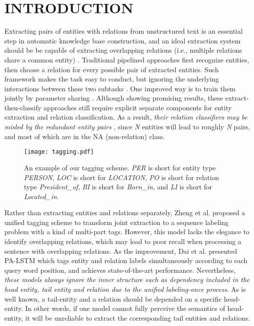 \documentclass{ecai}
\begin{document}
\section{INTRODUCTION}
Extracting pairs of entities with relations from unstructured text is an essential step in automatic knowledge base construction, and an ideal extraction system should be be capable of extracting overlapping relations (i.e., multiple relations share a common entity) \cite{zeng2018extracting}.
Traditional pipelined approaches first recognize entities, then choose a relation for every possible pair of extracted entities.
Such framework makes the task easy to conduct, but ignoring the underlying interactions between these two subtasks \cite{li2014incremental}.
One improved way is to train them jointly by parameter sharing \cite{fu-etal-2019-graphrel,miwa2016end,sun2019joint}.
Although showing promising results, these extract-then-classify approaches still require explicit separate components for entity extraction and relation classification.
As a result, \emph{their relation classifiers may be misled by the redundant entity pairs} \cite{dai2019joint,tan2019jointly}, since \emph{N} entities will lead to roughly \emph{N} pairs, and most of which are in the NA (non-relation) class.

\begin{figure*}
\centerline{\texttt{[image: tagging.pdf]}}
    \caption{An example of our tagging scheme. \emph{PER} is short for entity type \emph{PERSON}, \emph{LOC} is short for \emph{LOCATION}, \emph{PO} is short for relation type \emph{President\_of}, \emph{BI} is short for \emph{Born\_in}, and \emph{LI} is short for \emph{Located\_in}.}\label{fig:tagging}
\end{figure*}

Rather than extracting entities and relations separately, Zheng et al. \cite{zheng2017joint} proposed a unified tagging scheme to transform joint extraction to a sequence labeling problem with a kind of multi-part tags.
However, this model lacks the elegance to identify overlapping relations, which may lead to poor recall when processing a sentence with overlapping relations.
As the improvement, Dai et al. \cite{dai2019joint} presented PA-LSTM which tags entity and relation labels simultaneously according to each query word position, and achieves state-of-the-art performance.
Nevertheless, \emph{these models always ignore the inner structure such as dependency included in the head entity, tail entity and relation due to the unified labeling-once process}.
As is well known, a tail-entity and a relation should be depended on a specific head-entity. 
In other words, if one model cannot fully perceive the semantics of head-entity, it will be unreliable to extract the corresponding tail entities and relations.
\end{document}
